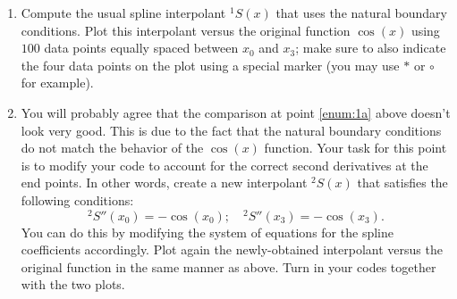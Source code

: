 \begin{enumerate}[label=(\alph*)]
  \item \label{enum:1a} Compute the usual spline interpolant $^{1} S(x)$ that uses the natural boundary conditions. Plot this interpolant versus the original function $\cos(x)$ using $100$ data points equally spaced between $x_{0}$ and $x_{3}$; make sure to also indicate the four data points on the plot using a special marker (you may use $\ast$ or $\circ$ for example).
  \item You will probably agree that the comparison at point \ref{enum:1a} above doesn't look very good. This is due to the fact that the natural boundary conditions do not match the behavior of the $\cos(x)$ function. Your task for this point is to modify your code to account for the correct second derivatives at the end points. In other words, create a new interpolant $^{2} S(x)$ that satisfies the following conditions:
    \begin{equation*}
      ^{2} S''(x_{0}) = -\cos(x_{0});
      \quad
      ^{2} S''(x_{3}) = -\cos(x_{3}).
    \end{equation*}
    You can do this by modifying the system of equations for the spline coefficients accordingly. Plot again the newly-obtained interpolant versus the original function in the same manner as above. Turn in your codes together with the two plots.
\end{enumerate}
